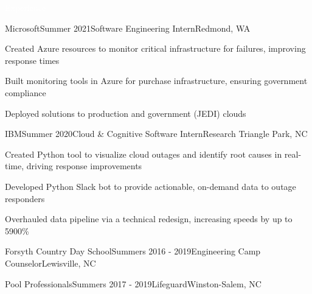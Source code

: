 \documentclass{resume}
\begin{document}
\begin{rSection}{\colorbox{NCSURED}{\textcolor{WHITE}{Experience}}}
	\begin{rSubsection}{Microsoft}{Summer 2021}{Software Engineering Intern}{Redmond, WA}
		\item
			Created Azure resources to monitor critical infrastructure for failures, improving response times
		\item
			Built monitoring tools in Azure for purchase infrastructure, ensuring government compliance
		\item
			Deployed solutions to production and government (JEDI) clouds
	\end{rSubsection}
	
	\begin{rSubsection}{IBM}{Summer 2020}{Cloud \& Cognitive Software Intern}{Research Triangle Park, NC}
		\item
			Created Python tool to visualize cloud outages and identify root causes in real-time, driving response improvements
		\item
			Developed Python Slack bot to provide actionable, on-demand data to outage responders
		\item
			Overhauled data pipeline via a technical redesign, increasing speeds by up to 5900\%
	\end{rSubsection}

	\begin{rSubsectionEmpty}{Forsyth Country Day School}{Summers 2016 - 2019}{Engineering Camp Counselor}{Lewisville, NC}
	\end{rSubsectionEmpty}

	\begin{rSubsectionEmpty}{Pool Professionals}{Summers 2017 - 2019}{Lifeguard}{Winston-Salem, NC}
	\end{rSubsectionEmpty}	
\end{rSection}
\end{document}
